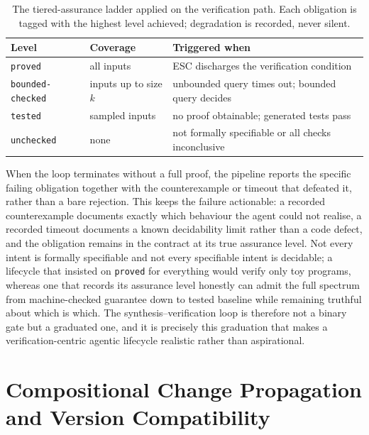 \begin{table}[t]
\centering
\caption{The tiered-assurance ladder applied on the verification path. Each obligation is tagged with the highest level achieved; degradation is recorded, never silent.}
\label{tab:a5-tiers}
\begin{tabular}{@{}lll@{}}
\toprule
Level & Coverage & Triggered when \\
\midrule
\texttt{proved} & all inputs & ESC discharges the verification condition \\
\texttt{bounded-checked} & inputs up to size $k$ & unbounded query times out; bounded query decides \\
\texttt{tested} & sampled inputs & no proof obtainable; generated tests pass \\
\texttt{unchecked} & none & not formally specifiable or all checks inconclusive \\
\bottomrule
\end{tabular}
\end{table}

When the loop terminates without a full proof, the pipeline reports the specific failing obligation together with the counterexample or timeout that defeated it, rather than a bare rejection. This keeps the failure actionable: a recorded counterexample documents exactly which behaviour the agent could not realise, a recorded timeout documents a known decidability limit rather than a code defect, and the obligation remains in the contract at its true assurance level. Not every intent is formally specifiable and not every specifiable intent is decidable; a lifecycle that insisted on \texttt{proved} for everything would verify only toy programs, whereas one that records its assurance level honestly can admit the full spectrum from machine-checked guarantee down to tested baseline while remaining truthful about which is which. The synthesis--verification loop is therefore not a binary gate but a graduated one, and it is precisely this graduation that makes a verification-centric agentic lifecycle realistic rather than aspirational.

\section{Compositional Change Propagation and Version Compatibility}\label{sec:a5-propagation}

